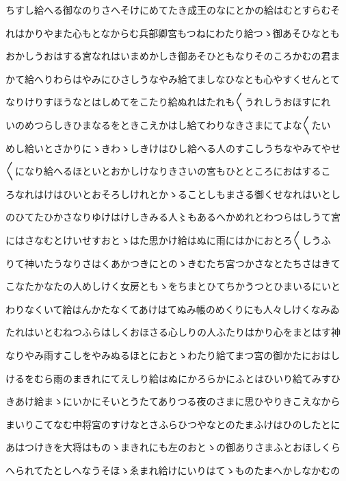 \documentclass[a4paper,11pt,landscape]{ltjtarticle}
\begin{document}
\par\medskip
ちすし給へる御なのりさへそけにめてたき成王のなにとかの給はむとすらむそ
\par\medskip
れはかりやまた心もとなからむ兵部卿宮もつねにわたり給つゝ御あそひなとも
\par\medskip
おかしうおはする宮なれはいまめかしき御あそひともなりそのころかむの君ま
\par\medskip
かて給へりわらはやみにひさしうなやみ給てましなひなとも心やすくせんとて
\par\medskip
なりけりすほうなとはしめてをこたり給ぬれはたれも〱うれしうおほすにれ
\par\medskip
いのめつらしきひまなるをときこえかはし給てわりなきさまにてよな〱たい
\par\medskip
めし給いとさかりにゝきわゝしきけはひし給へる人のすこしうちなやみてやせ
\par\medskip
〱になり給へるほといとおかしけなりきさいの宮もひとところにおはするこ
\par\medskip
ろなれはけはひいとおそろしけれとかゝることしもまさる御くせなれはいとし
\par\medskip
のひてたひかさなりゆけはけしきみる人〻もあるへかめれとわつらはしうて宮
\par\medskip
にはさなむとけいせすおとゝはた思かけ給はぬに雨にはかにおとろ〱しうふ
\par\medskip
りて神いたうなりさはくあかつきにとのゝきむたち宮つかさなとたちさはきて
\par\medskip
こなたかなたの人めしけく女房ともゝをちまとひてちかうつとひまいるにいと
\par\medskip
わりなくいて給はんかたなくてあけはてぬみ帳のめくりにも人々しけくなみゐ
\par\medskip
たれはいとむねつふらはしくおほさる心しりの人ふたりはかり心をまとはす神
\par\medskip
なりやみ雨すこしをやみぬるほとにおとゝわたり給てまつ宮の御かたにおはし
\par\medskip
けるをむら雨のまきれにてえしり給はぬにかろらかにふとはひいり給てみすひ
\par\medskip
きあけ給まゝにいかにそいとうたてありつる夜のさまに思ひやりきこえなから
\par\medskip
まいりこてなむ中将宮のすけなとさふらひつやなとのたまふけはひのしたとに
\par\medskip
あはつけきを大将はものゝまきれにも左のおとゝの御ありさまふとおほしくら
\par\medskip
へられてたとしへなうそほゝゑまれ給けにいりはてゝものたまへかしなかむの
\par\medskip
\end{document}
